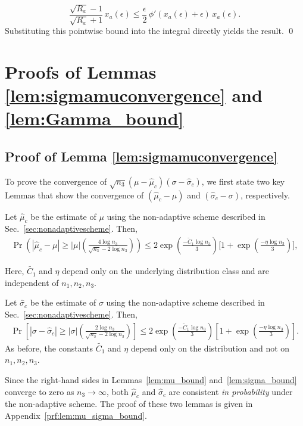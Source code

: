 \documentclass[10pt]{article} %
\theoremstyle{plain}
\theoremstyle{definition}
\theoremstyle{remark}
\begin{document}
\[
\frac{\sqrt{R_a} - 1}{\sqrt{R_a} + 1} \, x_a(\epsilon) \leq \frac{\epsilon}{2} \, \phi'(x_a(\epsilon) + \epsilon) \, x_a(\epsilon).
\]
Substituting this pointwise bound into the integral directly yields the result.
\qed


\section{Proofs of Lemmas \ref{lem:sigmamuconvergence} and \ref{lem:Gamma_bound}}\label{prf:sigmamuconvergence}
\subsection{Proof of Lemma \ref{lem:sigmamuconvergence}}
To prove the convergence of 
\(\sqrt{n_3}(\mu - \hat{\mu}_c)(\sigma - \hat{\sigma}_c)\), 
we first state two key Lemmas that show the convergence of 
\((\hat{\mu}_c - \mu)\) and \((\hat{\sigma}_c - \sigma)\), respectively.

\begin{lemma} \label{lem:mu_bound}
Let $\hat{\mu}_c$ be the estimate of $\mu$ using the non-adaptive scheme described in 
Sec.~\ref{sec:nonadaptivescheme}. Then,
\begin{align}
\Pr\!\left(
\left| \hat{\mu}_c - \mu \right|
\geq 
|\mu|
\left(
\frac{4\log n_3}{\sqrt{n_3} - 2\log n_3}
\right)
\right)
\le 
2 \exp\!\left( \frac{-\tilde C_1 \log n_3}{3} \right)
\Big[
1 + \exp\!\left( \frac{-\eta \log n_3}{3} \right)
\Big],
\end{align}

Here, $\tilde{C_1}$ and $\eta$ depend only on the underlying distribution class and 
are independent of  $n_1,n_2,n_3$.
\end{lemma}

\begin{lemma}\label{lem:sigma_bound}
Let $\hat{\sigma}_c$ be the estimate of $\sigma$ using the non-adaptive scheme described 
in Sec.~\ref{sec:nonadaptivescheme}. Then,
\begin{equation}
\begin{aligned}
\Pr \left[
\left| \sigma - \hat{\sigma}_c \right|
\geq 
|\sigma|
\left(
\frac{2 \log n_3}{\sqrt{n_3} - 2 \log n_3}
\right)
\right]
\le 
2 \exp\!\left( \frac{-\tilde C_1 \log n_3}{3} \right)
\left[
1 + \exp\!\left( \frac{-\eta \log n_3}{3} \right)
\right].
\end{aligned}
\end{equation}
As before, the constants $\tilde{C_1}$ and $\eta$ depend only on the distribution  and not on $n_1,n_2,n_3$.
\end{lemma}
Since the right-hand sides in Lemmas~\ref{lem:mu_bound} and~\ref{lem:sigma_bound} 
converge to zero as $n_3 \to \infty$, both 
$\hat{\mu}_c$ and $\hat{\sigma}_c$ are consistent \emph{in probability} under the non-adaptive scheme.
The proof of these two lemmas is given in Appendix~\ref{prf:lem:mu_sigma_bound}.
\end{document}
